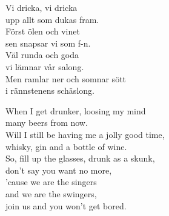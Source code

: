 \documentclass[a6paper, 10pt, twoside]{article}
\begin{document}
\begin{center}
\end{center}
\begin{lyrics}
Vi dricka, vi dricka\\
upp allt som dukas fram.\\
Först ölen och vinet\\
sen snapsar vi som f-n.\\
Väl runda och goda\\
vi lämnar vår salong.\\
Men ramlar ner och somnar sött\\
i rännstenens schäslong.
\end{lyrics}
\vspace{40pt}
\begin{center}
\end{center}
\begin{lyrics}
When I get drunker, loosing my mind\\
many beers from now.\\
Will I still be having me a jolly good time,\\
whisky, gin and a bottle of wine.\\
So, fill up the glasses, drunk as a skunk,\\
don't say you want no more,\\
'cause we are the singers\\
and we are the swingers,\\
join us and you won't get bored.
\end{lyrics}
\end{document}

